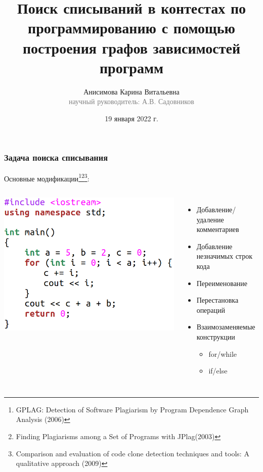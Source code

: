 \documentclass[10pt]{beamer}
\begin{document}
\title[Поиск списываний в контестах]{Поиск списываний в контестах по программированию с помощью построения графов зависимостей программ}

\author[Анисимова К.В.]{Анисимова Карина Витальевна\\{\footnotesize\textcolor{gray}{научный руководитель: А.В. Садовников}}}
\date{19 января 2022 г.}
\frame{\titlepage}

\begin{frame}\frametitle{Задача поиска списывания}
		\hspace{-0.5cm}
Основные модификации\footnote[frame]{GPLAG: Detection of Software Plagiarism by Program Dependence Graph Analysis (2006)}\footnote[frame]{Finding Plagiarisms among a Set of Programs with JPlag(2003)}\footnote[frame]{Comparison and evaluation of code clone detection techniques and tools: A qualitative approach (2009)}:
\begin{columns}
  \centering
  \includegraphics[scale=0.7]{clear.png}
  
  \centering
  \begin{itemize}
  	\item Добавление/удаление комментариев
  	\item Добавление незначимых строк кода
  	\item Переименование
  	\item Перестановка операций
  	\item Взаимозаменяемые конструкции
  	\begin{itemize}
  		\item for/while
  		\item if/else
  	\end{itemize}
  \end{itemize}
\end{columns}
\end{frame}
\end{document}
